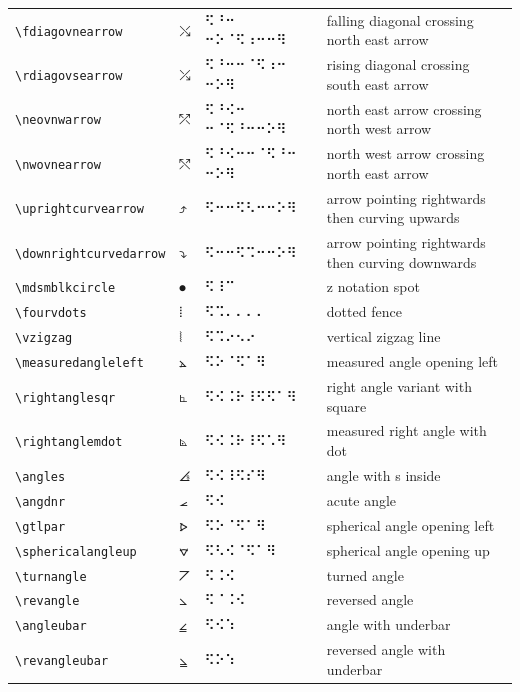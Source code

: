 \documentclass[oneside]{article}
\begin{document}
\begin{longtable}{llll}
\verb|\fdiagovnearrow| & $\fdiagovnearrow$ &   ⠫⠘⠒ ⠒⠕⠈⠫⠰⠒⠒⠻   & {falling diagonal crossing north east arrow} \\[2ex]
\verb|\rdiagovsearrow| & $\rdiagovsearrow$ &   ⠫⠘⠒⠒⠈⠫⠰⠒ ⠒⠕⠻   & {rising diagonal crossing south east arrow} \\[2ex]
\verb|\neovnwarrow| & $\neovnwarrow$ &   ⠫⠘⠪⠒ ⠒⠈⠫⠘⠒⠒⠕⠻   & {north east arrow crossing north west arrow} \\[2ex]
\verb|\nwovnearrow| & $\nwovnearrow$ &   ⠫⠘⠪⠒⠒⠈⠫⠘⠒ ⠒⠕⠻   & {north west arrow crossing north east arrow} \\[2ex]
\verb|\uprightcurvearrow| & $\uprightcurvearrow$ &   ⠫⠒⠒⠫⠣⠒⠒⠕⠻   & {arrow pointing rightwards then curving upwards} \\[2ex]
\verb|\downrightcurvedarrow| & $\downrightcurvedarrow$ &   ⠫⠒⠒⠫⠩⠒⠒⠕⠻   & {arrow pointing rightwards then curving downwards} \\[2ex]
\verb|\mdsmblkcircle| & $\mdsmblkcircle$ &  ⠫⠸⠉  & {z notation spot} \\[2ex]
\verb|\fourvdots| & $\fourvdots$ &  ⠫⠩⠄⠄⠄⠄  & {dotted fence} \\[2ex]
\verb|\vzigzag| & $\vzigzag$ &  ⠫⠩⠔⠢⠔  & {vertical zigzag line} \\[2ex]
\verb|\measuredangleleft| & $\measuredangleleft$ &  ⠫⠕⠈⠫⠁⠻  & {measured angle opening left} \\[2ex]
\verb|\rightanglesqr| & $\rightanglesqr$ &  ⠫⠪⠨⠗⠸⠫⠫⠁⠻  & {right angle variant with square} \\[2ex]
\verb|\rightanglemdot| & $\rightanglemdot$ &  ⠫⠪⠨⠗⠸⠫⠡⠻  & {measured right angle with dot} \\[2ex]
\verb|\angles| & $\angles$ &  ⠫⠪⠸⠫⠎⠻  & {angle with s inside} \\[2ex]
\verb|\angdnr| & $\angdnr$ &  ⠫⠪  & {acute angle} \\[2ex]
\verb|\gtlpar| & $\gtlpar$ &  ⠫⠕⠈⠫⠁⠻  & {spherical angle opening left} \\[2ex]
\verb|\sphericalangleup| & $\sphericalangleup$ &  ⠫⠣⠪⠈⠫⠁⠻  & {spherical angle opening up} \\[2ex]
\verb|\turnangle| & $\turnangle$ &  ⠫⠨⠪  & {turned angle} \\[2ex]
\verb|\revangle| & $\revangle$ &  ⠫⠈⠨⠪  & {reversed angle} \\[2ex]
\verb|\angleubar| & $\angleubar$ &  ⠫⠪⠱  & {angle with underbar} \\[2ex]
\verb|\revangleubar| & $\revangleubar$ &  ⠫⠕⠱  & {reversed angle with underbar} \\[2ex]

\end{longtable}
\end{document}
